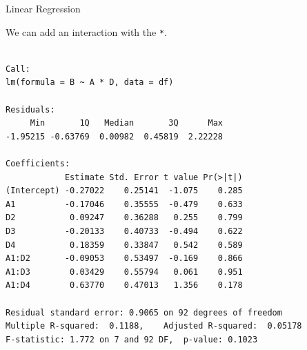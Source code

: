 \begin{frame}[fragile]{Linear Regression}

We can add an interaction with the \texttt{*}. \small

\begin{Shaded}
\begin{Highlighting}[]
\StringTok{ }\OperatorTok{~}\StringTok{ }\OperatorTok{*}
\end{Highlighting}
\end{Shaded}

\begin{verbatim}

Call:
lm(formula = B ~ A * D, data = df)

Residuals:
     Min       1Q   Median       3Q      Max 
-1.95215 -0.63769  0.00982  0.45819  2.22228 

Coefficients:
            Estimate Std. Error t value Pr(>|t|)
(Intercept) -0.27022    0.25141  -1.075    0.285
A1          -0.17046    0.35555  -0.479    0.633
D2           0.09247    0.36288   0.255    0.799
D3          -0.20133    0.40733  -0.494    0.622
D4           0.18359    0.33847   0.542    0.589
A1:D2       -0.09053    0.53497  -0.169    0.866
A1:D3        0.03429    0.55794   0.061    0.951
A1:D4        0.63770    0.47013   1.356    0.178

Residual standard error: 0.9065 on 92 degrees of freedom
Multiple R-squared:  0.1188,    Adjusted R-squared:  0.05178 
F-statistic: 1.772 on 7 and 92 DF,  p-value: 0.1023
\end{verbatim}

\end{frame}

